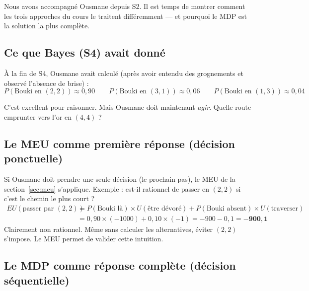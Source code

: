 \documentclass[11pt,a4paper]{article}
\begin{document}
Nous avons accompagné Ousmane depuis S2. Il est temps de montrer comment les trois approches du cours le traitent différemment --- et pourquoi le MDP est la solution la plus complète.

\subsection{Ce que Bayes (S4) avait donné}

À la fin de S4, Ousmane avait calculé (après avoir entendu des grognements et observé l'absence de brise) :
$$P(\text{Bouki en }(2,2)) \approx 0{,}90 \qquad P(\text{Bouki en }(3,1)) \approx 0{,}06 \qquad P(\text{Bouki en }(1,3)) \approx 0{,}04$$

C'est excellent pour raisonner. Mais Ousmane doit maintenant \textit{agir}. Quelle route emprunter vers l'or en $(4,4)$ ?

\subsection{Le MEU comme première réponse (décision ponctuelle)}

Si Ousmane doit prendre une seule décision (le prochain pas), le MEU de la section~\ref{sec:meu} s'applique. Exemple : est-il rationnel de passer en $(2,2)$ si c'est le chemin le plus court ?
\begin{align*}
EU(\text{passer par }(2,2)) &= P(\text{Bouki là}) \times U(\text{être dévoré}) + P(\text{Bouki absent}) \times U(\text{traverser}) \\
&= 0{,}90 \times (-1000) + 0{,}10 \times (-1) = -900 - 0{,}1 = \mathbf{-900{,}1}
\end{align*}
Clairement non rationnel. Même sans calculer les alternatives, éviter $(2,2)$ s'impose. Le MEU permet de valider cette intuition.

\subsection{Le MDP comme réponse complète (décision séquentielle)}
\end{document}
